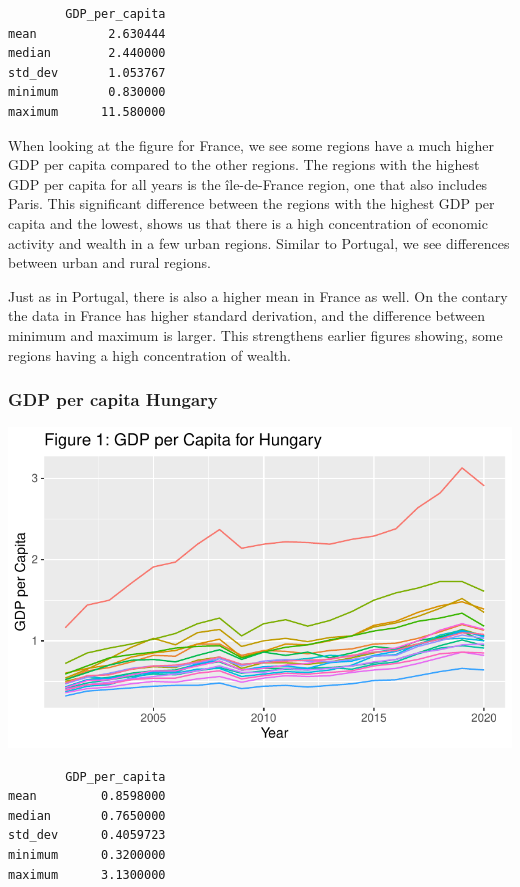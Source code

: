 \documentclass[
  a4paper,
  DIV=11,
  numbers=noendperiod]{scrartcl}
\begin{document}
\begin{verbatim}
        GDP_per_capita
mean          2.630444
median        2.440000
std_dev       1.053767
minimum       0.830000
maximum      11.580000
\end{verbatim}

When looking at the figure for France, we see some regions have a much
higher GDP per capita compared to the other regions. The regions with
the highest GDP per capita for all years is the île-de-France region,
one that also includes Paris. This significant difference between the
regions with the highest GDP per capita and the lowest, shows us that
there is a high concentration of economic activity and wealth in a few
urban regions. Similar to Portugal, we see differences between urban and
rural regions.

Just as in Portugal, there is also a higher mean in France as well. On
the contary the data in France has higher standard derivation, and the
difference between minimum and maximum is larger. This strengthens
earlier figures showing, some regions having a high concentration of
wealth.

\hypertarget{gdp-per-capita-hungary}{%
\subsubsection{GDP per capita Hungary}\label{gdp-per-capita-hungary}}

\includegraphics{MSB104_GR_1_Final_Assignment_research_article_files/figure-pdf/unnamed-chunk-13-1.pdf}

\begin{verbatim}
        GDP_per_capita
mean         0.8598000
median       0.7650000
std_dev      0.4059723
minimum      0.3200000
maximum      3.1300000
\end{verbatim}
\end{document}
